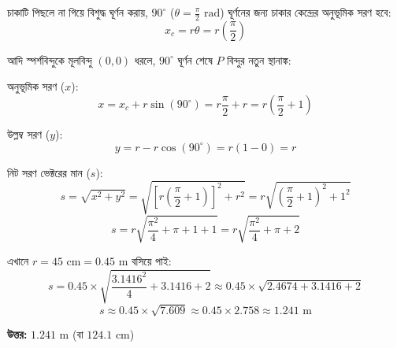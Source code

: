 \documentclass[11pt,a4paper]{article}
\begin{document}
\begin{solbox}
\begin{center}
\end{center}

চাকাটি পিছলে না গিয়ে বিশুদ্ধ ঘূর্ণন করায়, $90^\circ$ ($\theta = \frac{\pi}{2}\text{ rad}$) ঘূর্ণনের জন্য চাকার কেন্দ্রের অনুভূমিক সরণ হবে:
$$x_c = r\theta = r\left(\frac{\pi}{2}\right)$$

আদি স্পর্শবিন্দুকে মূলবিন্দু $(0,0)$ ধরলে, $90^\circ$ ঘূর্ণন শেষে $P$ বিন্দুর নতুন স্থানাঙ্ক:

অনুভূমিক সরণ ($x$):
$$x = x_c + r\sin(90^\circ) = r\frac{\pi}{2} + r = r\left(\frac{\pi}{2} + 1\right)$$

উল্লম্ব সরণ ($y$):
$$y = r - r\cos(90^\circ) = r(1 - 0) = r$$

নিট সরণ ভেক্টরের মান ($s$):
$$s = \sqrt{x^2 + y^2} = \sqrt{\left[r\left(\frac{\pi}{2} + 1\right)\right]^2 + r^2} = r\sqrt{\left(\frac{\pi}{2} + 1\right)^2 + 1^2}$$
$$s = r\sqrt{\frac{\pi^2}{4} + \pi + 1 + 1} = r\sqrt{\frac{\pi^2}{4} + \pi + 2}$$

এখানে $r = 45\text{ cm} = 0.45\text{ m}$ বসিয়ে পাই:
$$s = 0.45 \times \sqrt{\frac{3.1416^2}{4} + 3.1416 + 2} \approx 0.45 \times \sqrt{2.4674 + 3.1416 + 2}$$
$$s \approx 0.45 \times \sqrt{7.609} \approx 0.45 \times 2.758 \approx 1.241\text{ m}$$

\textbf{উত্তর:} $1.241\text{ m}$ (বা $124.1\text{ cm}$)
\end{solbox}
\end{document}
